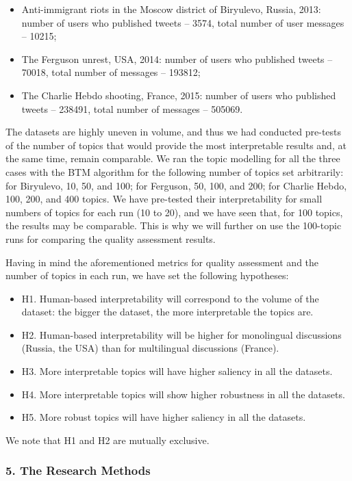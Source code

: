 \begin{itemize}
	\item Anti-immigrant riots in the Moscow district of Biryulevo, Russia, 2013: number of users who published tweets -- 3574, total number of user messages -- 10215;
	\item The Ferguson unrest, USA, 2014: number of users who published tweets -- 70018, total number of messages -- 193812;
	\item The Charlie Hebdo shooting, France, 2015: number of users who published tweets -- 238491, total number of messages -- 505069.
\end{itemize}

The datasets are highly uneven in volume, and thus we had conducted pre-tests of the number of topics that would provide the most interpretable results and, at the same time, remain comparable. We ran the topic modelling for all the three cases with the BTM algorithm for the following number of topics set arbitrarily: for Biryulevo, 10, 50, and 100; for Ferguson, 50, 100, and 200; for Charlie Hebdo, 100, 200, and 400 topics. We have pre-tested their interpretability for small numbers of topics for each run (10 to 20), and we have seen that, for 100 topics, the results may be comparable. This is why we will further on use the 100-topic runs for comparing the quality assessment results.

Having in mind the aforementioned metrics for quality assessment and the number of topics in each run, we have set the following hypotheses:
\begin{itemize}
	\item H1. Human-based interpretability will correspond to the volume of the dataset: the bigger the dataset, the more interpretable the topics are.
	\item H2. Human-based interpretability will be higher for monolingual discussions (Russia, the USA) than for multilingual discussions (France).
	\item H3. More interpretable topics will have higher saliency in all the datasets. 
	\item H4. More interpretable topics will show higher robustness in all the datasets. 
	\item H5. More robust topics will have higher saliency in all the datasets.
\end{itemize}

We note that H1 and H2 are mutually exclusive.

\subsubsection{5. The Research Methods}


